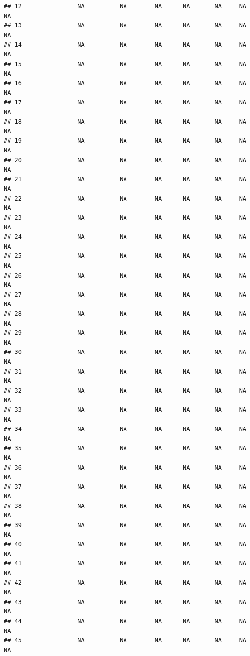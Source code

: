 \documentclass[
]{article}
\begin{document}
\begin{verbatim}
## 12                NA          NA        NA      NA       NA     NA     NA
## 13                NA          NA        NA      NA       NA     NA     NA
## 14                NA          NA        NA      NA       NA     NA     NA
## 15                NA          NA        NA      NA       NA     NA     NA
## 16                NA          NA        NA      NA       NA     NA     NA
## 17                NA          NA        NA      NA       NA     NA     NA
## 18                NA          NA        NA      NA       NA     NA     NA
## 19                NA          NA        NA      NA       NA     NA     NA
## 20                NA          NA        NA      NA       NA     NA     NA
## 21                NA          NA        NA      NA       NA     NA     NA
## 22                NA          NA        NA      NA       NA     NA     NA
## 23                NA          NA        NA      NA       NA     NA     NA
## 24                NA          NA        NA      NA       NA     NA     NA
## 25                NA          NA        NA      NA       NA     NA     NA
## 26                NA          NA        NA      NA       NA     NA     NA
## 27                NA          NA        NA      NA       NA     NA     NA
## 28                NA          NA        NA      NA       NA     NA     NA
## 29                NA          NA        NA      NA       NA     NA     NA
## 30                NA          NA        NA      NA       NA     NA     NA
## 31                NA          NA        NA      NA       NA     NA     NA
## 32                NA          NA        NA      NA       NA     NA     NA
## 33                NA          NA        NA      NA       NA     NA     NA
## 34                NA          NA        NA      NA       NA     NA     NA
## 35                NA          NA        NA      NA       NA     NA     NA
## 36                NA          NA        NA      NA       NA     NA     NA
## 37                NA          NA        NA      NA       NA     NA     NA
## 38                NA          NA        NA      NA       NA     NA     NA
## 39                NA          NA        NA      NA       NA     NA     NA
## 40                NA          NA        NA      NA       NA     NA     NA
## 41                NA          NA        NA      NA       NA     NA     NA
## 42                NA          NA        NA      NA       NA     NA     NA
## 43                NA          NA        NA      NA       NA     NA     NA
## 44                NA          NA        NA      NA       NA     NA     NA
## 45                NA          NA        NA      NA       NA     NA     NA

\end{verbatim}
\end{document}
